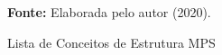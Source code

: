 \begin{figure}[ht!]
\centering

\caption{\textmd{Lista de Conceitos de Estrutura \gls{MPS}}}
\label{fig:structure}

\par\medskip\textbf{Fonte:} Elaborada pelo autor (2020). \par\medskip

\end{figure}

